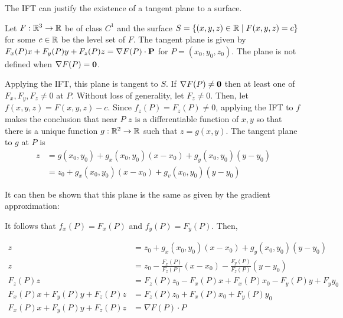 The IFT can justify the existence of a tangent plane to a surface.

Let $F:\mathbb{R}^3\to \mathbb{R}$ be of class $C^1$ and the surface $S=\{(x,y,z)\in\mathbb{R}\;|\;F(x,y,z)=c\}$ for some $c\in\mathbb{R}$ be the level set of $F$.
The tangent plane is given by $F_x(P)x+F_y(P)y+F_z(P)z=\nabla F(P)\cdot \textbf P$ for $P=(x_0,y_0,z_0)$. The plane is not defined when
$\nabla F(P)=\textbf 0$. 

Applying the IFT, this plane is tangent to $S$. If $\nabla F(P)\neq \textbf 0$ then at least one of $F_x,F_y,F_z\neq 0$ at $P$.
Without loss of generality, let $F_z\neq 0$. Then, let $f(x,y,z)=F(x,y,z)-c$. Since $f_z(P)=F_z(P)\neq 0$, applying the IFT to $f$ makes the conclusion that 
near $P$ $z$ is a differentiable function of $x,y$ so that there is a unique function $g:\mathbb{R}^2\to \mathbb{R}$ such that $z=g(x,y)$. The tangent plane to $g$ at $P$ is 
\begin{align*}
    z &=g\left(x_{0}, y_{0}\right)+g_{x}\left(x_{0}, y_{0}\right)\left(x-x_{0}\right)+g_{y}\left(x_{0}, y_{0}\right)\left(y-y_{0}\right) \\
    &=z_{0}+g_{x}\left(x_{0}, y_{0}\right)\left(x-x_{0}\right)+g_{v}\left(x_{0}, y_{0}\right)\left(y-y_{0}\right)
\end{align*}

It can then be shown that this plane is the same as given by the gradient approximation:

It follows that $f_x(P)=F_x(P)$ and $f_y(P)=F_y(P)$. Then,

\begin{align*}
    z&=z_0+g_x(x_0,y_0)(x-x_0)+g_y(x_0,y_0)(y-y_0)\\
    z&=z_0-\frac{F_x(P)}{F_z(P)}(x-x_0)-\frac{F_y(P)}{F_z(P)}(y-y_0)\\
    F_z(P)z&=F_z(P)z_0-F_x(P)x+F_x(P)x_0-F_y(P)y+F_yy_0\\
    F_x(P)x+F_y(P)y+F_z(P)z&=F_z(P)z_0+F_x(P)x_0+F_y(P)y_0\\
    F_x(P)x+F_y(P)y+F_z(P)z&=\nabla F(P)\cdot P
\end{align*}

